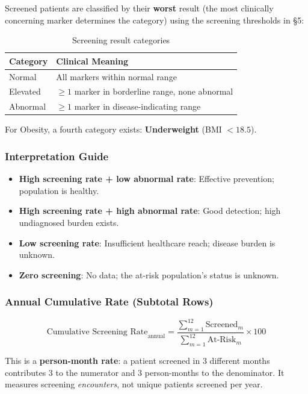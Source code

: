 \documentclass[11pt,a4paper]{article}
\begin{document}
Screened patients are classified by their \textbf{worst} result (the most clinically concerning marker determines the category) using the screening thresholds in §5:

\begin{table}[ht]
\centering
\caption{Screening result categories}
\begin{tabular}{@{}ll@{}}
\toprule
\textbf{Category} & \textbf{Clinical Meaning} \\
\midrule
Normal & All markers within normal range \\
Elevated & $\geq 1$ marker in borderline range, none abnormal \\
Abnormal & $\geq 1$ marker in disease-indicating range \\
\bottomrule
\end{tabular}
\end{table}

For Obesity, a fourth category exists: \textbf{Underweight} (BMI $< 18.5$).

\subsubsection{Interpretation Guide}

\begin{itemize}[leftmargin=*]
    \item \textbf{High screening rate + low abnormal rate}: Effective prevention; population is healthy.
    \item \textbf{High screening rate + high abnormal rate}: Good detection; high undiagnosed burden exists.
    \item \textbf{Low screening rate}: Insufficient healthcare reach; disease burden is unknown.
    \item \textbf{Zero screening}: No data; the at-risk population's status is unknown.
\end{itemize}

\subsubsection{Annual Cumulative Rate (Subtotal Rows)}

\begin{equation}
\text{Cumulative Screening Rate}_{\text{annual}} =
\frac{\sum_{m=1}^{12} \text{Screened}_m}
     {\sum_{m=1}^{12} \text{At-Risk}_m} \times 100
\end{equation}

This is a \textbf{person-month rate}: a patient screened in 3 different months contributes 3 to the numerator and 3 person-months to the denominator. It measures screening \textit{encounters}, not unique patients screened per year.
\end{document}
